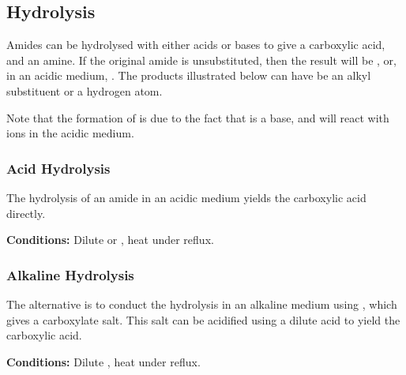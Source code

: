 


		\subsection{Hydrolysis}

			Amides can be hydrolysed with either acids or bases to give a carboxylic acid, and an amine. If the original amide is unsubstituted,
			then the result will be , or, in an acidic medium, . The products illustrated below can have  be an alkyl
			substituent or a hydrogen atom.

			Note that the formation of  is due to the fact that  is a base, and will react with  ions in the acidic
			medium.

			\subsubsection{Acid Hydrolysis}

				The hydrolysis of an amide in an acidic medium yields the carboxylic acid directly.

				\vspace{1.5em}
				\vbox{\textbf{Conditions:}	\tabto{35mm}Dilute  or , heat under reflux.}



			\pagebreak
			\subsubsection{Alkaline Hydrolysis}

				The alternative is to conduct the hydrolysis in an alkaline medium using , which gives a carboxylate salt.
				This salt can be acidified using a dilute acid to yield the carboxylic acid.

				\vspace{1.5em}
				\vbox{\textbf{Conditions:}	\tabto{35mm}Dilute , heat under reflux.}


